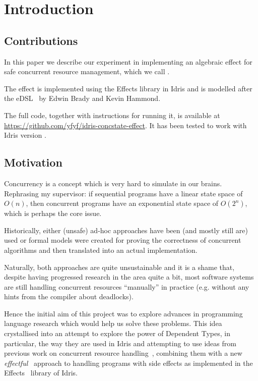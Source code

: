 \section{Introduction}

\subsection{Contributions}

In this paper we describe our experiment in implementing an algebraic effect
for safe concurrent resource management, which we call .

The effect is implemented using the Effects library in Idris and is modelled
after the  eDSL~\cite{cbconc-fi} by Edwin Brady and Kevin
Hammond.

The full code, together with instructions for running it, is available at
{\url{https://github.com/yfyf/idris-concstate-effect}}.
It has been tested to work with Idris version \version.

\subsection{Motivation}

Concurrency is a concept which is very hard to simulate in our brains.
Rephrasing my supervisor: if sequential programs have a linear state space of
$O(n)$, then concurrent programs have an exponential state space of $O(2^n)$,
which is perhaps the core issue.

Historically, either (unsafe) ad-hoc approaches have been (and mostly still
are) used or formal models were created for proving the correctness of
concurrent algorithms and then translated into an actual implementation.

Naturally, both approaches are quite unsustainable and it is a shame that,
despite having progressed research in the area quite a bit, most software
systems are still handling concurrent resources ``manually'' in practice (e.g.
without any hints from the compiler about deadlocks).

Hence the initial aim of this project was to explore advances in programming
language research which would help us solve these problems. This idea
crystallised into an attempt to explore the power of Dependent Types, in
particular, the way they are used in Idris and attempting to use ideas from
previous work on concurrent resource handling~\cite{cbconc-fi}, combining them
with a new \emph{effectful}~\cite{eff} approach to handling programs with side
effects as implemented in the Effects~\cite{effects-idr} library of Idris.

